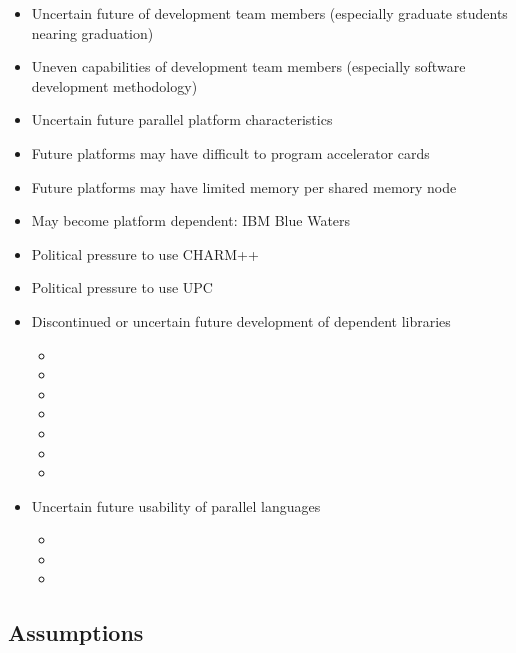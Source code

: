 \documentclass{article}
\begin{document}
    \begin{itemize} 
%
    \item Uncertain future of development team members (especially
    graduate students nearing graduation)
%
    \item Uneven capabilities of development team members (especially
    software development methodology)
%
    \item Uncertain future parallel platform characteristics
%
    \item Future platforms may have difficult to program accelerator cards
%
    \item Future platforms may have limited memory per shared memory node
%
    \item May become platform dependent: IBM Blue Waters
%
    \item Political pressure to use CHARM++
%
    \item Political pressure to use UPC
%
    \item Discontinued or uncertain future development of dependent libraries
%
    \begin{itemize}
        \item {}
        \item {}
        \item {}
        \item {}
        \item {}
        \item {}
        \item {}
    \end{itemize}
%
    \item Uncertain future usability of parallel languages
%
    \begin{itemize}
        \item {}
        \item {}
        \item {}
    \end{itemize}
%
\end{itemize}

   


\subsection{Assumptions}
\end{document}
